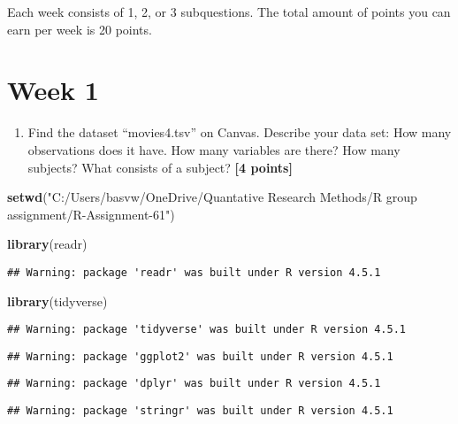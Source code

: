 \documentclass[
]{article}
\newenvironment{Shaded}{\begin{snugshade}}{\end{snugshade}}
\newcommand{\FunctionTok}[1]{\textcolor[rgb]{0.13,0.29,0.53}{\textbf{#1}}}
\newcommand{\NormalTok}[1]{#1}
\newcommand{\StringTok}[1]{\textcolor[rgb]{0.31,0.60,0.02}{#1}}
\providecommand{\tightlist}{%
  \setlength{\itemsep}{0pt}\setlength{\parskip}{0pt}}
\begin{document}
Each week consists of 1, 2, or 3 subquestions. The total amount of
points you can earn per week is 20 points.

\section{Week 1}\label{week-1}

\begin{enumerate}
\def\labelenumi{\arabic{enumi}.}
\tightlist
\item
  Find the dataset ``movies4.tsv'' on Canvas. Describe your data set:
  How many observations does it have. How many variables are there? How
  many subjects? What consists of a subject? \textbf{[4 points]}
\end{enumerate}

\begin{Shaded}
\begin{Highlighting}[]
\FunctionTok{setwd}\NormalTok{(}\StringTok{"C:/Users/basvw/OneDrive/Quantative Research Methods/R group assignment/R{-}Assignment{-}61"}\NormalTok{)}

\FunctionTok{library}\NormalTok{(readr)}
\end{Highlighting}
\end{Shaded}

\begin{verbatim}
## Warning: package 'readr' was built under R version 4.5.1
\end{verbatim}

\begin{Shaded}
\begin{Highlighting}[]
\FunctionTok{library}\NormalTok{(tidyverse)}
\end{Highlighting}
\end{Shaded}

\begin{verbatim}
## Warning: package 'tidyverse' was built under R version 4.5.1
\end{verbatim}

\begin{verbatim}
## Warning: package 'ggplot2' was built under R version 4.5.1
\end{verbatim}

\begin{verbatim}
## Warning: package 'dplyr' was built under R version 4.5.1
\end{verbatim}

\begin{verbatim}
## Warning: package 'stringr' was built under R version 4.5.1
\end{verbatim}
\end{document}
